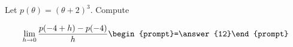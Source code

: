 \documentclass{ximera}
\author{Bart Snapp}
\begin{document}
\begin{exercise}
Let $p(\theta) = (\theta +2)^3$. Compute

\[
\lim_{ h\to 0 } \frac{p(-4+h)-p(-4)}{h} \begin{prompt}=\answer{12}\end{prompt}
\]
\end{exercise}
\end{document}
